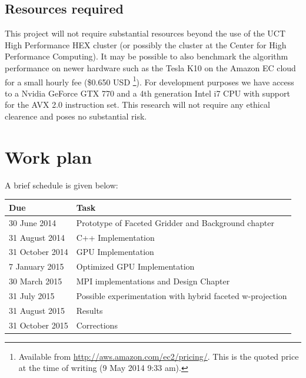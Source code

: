 \documentclass[a4paper, two column]{article}
\begin{document}
\subsection{Resources required} 
 This project will not require substantial resources beyond the use of the UCT High Performance HEX cluster (or possibly the cluster at the Center for High Performance Computing). It may be possible to also benchmark the algorithm performance
 on newer hardware such as the Tesla K10 on the Amazon EC cloud for a small hourly fee (\$0.650 USD \footnote{Available from \url{http://aws.amazon.com/ec2/pricing/}. This is the quoted price at the time of writing (9 May 2014 9:33 am).}). For development purposes we have access to a Nvidia GeForce 
 GTX 770 and a 4th generation Intel i7 CPU with support for the AVX 2.0 instruction set. This research will not require any ethical clearence and poses no substantial risk.
\section{Work plan}
A brief schedule is given below:\\
\begin{tabular}{|p{2.5cm}|p{5cm}|}
 \hline
 \textbf{Due} & \textbf{Task} \\
 \hline
 30 June 2014 & Prototype of Faceted Gridder and Background chapter\\
 \hline
 31 August 2014 & C++ Implementation\\
 \hline
 31 October 2014 & GPU Implementation\\
 \hline
 7 January 2015 & Optimized GPU Implementation\\
 \hline
 30 March 2015 & MPI implementations and Design Chapter\\
 \hline
 31 July 2015 & Possible experimentation with hybrid faceted w-projection\\
 \hline
 31 August 2015 & Results \\
 \hline
 31 October 2015 & Corrections \\
 \hline
\end{tabular}
{


}
\end{document}
